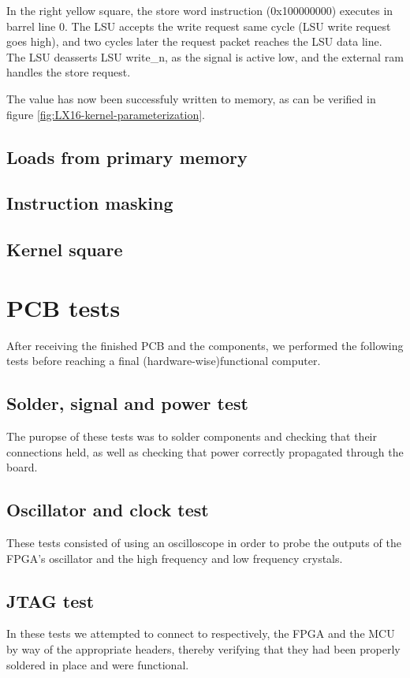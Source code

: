 \documentclass[../main/report.tex]{subfiles}
\begin{document}
In the right yellow square, the store word instruction (0x100000000) executes in barrel line 0.
The LSU accepts the write request same cycle (LSU write request goes high), and two cycles later the request packet reaches the LSU data line.
The LSU deasserts LSU write\_n, as the signal is active low, and the external ram handles the store request.

The value has now been successfuly written to memory, as can be verified in figure \ref{fig:LX16-kernel-parameterization}.

\subsection{Loads from primary memory}

\subsection{Instruction masking}

\subsection{Kernel square}







\section{PCB tests}

After receiving the finished PCB and the components, we performed the following tests before reaching a final (hardware-wise)functional computer.   

\subsection{Solder, signal and power test}
The puropse of these tests was to solder components and checking that their connections held, as well as checking that power correctly propagated through the board.  


\subsection{Oscillator and clock test}
These tests consisted of using an oscilloscope in order to probe the outputs of the FPGA's oscillator and the high frequency and low frequency crystals.


\subsection{JTAG test}
In these tests we attempted to connect to respectively, the FPGA and the MCU by way of the appropriate headers, thereby verifying that they had been properly soldered in place and were functional.

\end{document}

